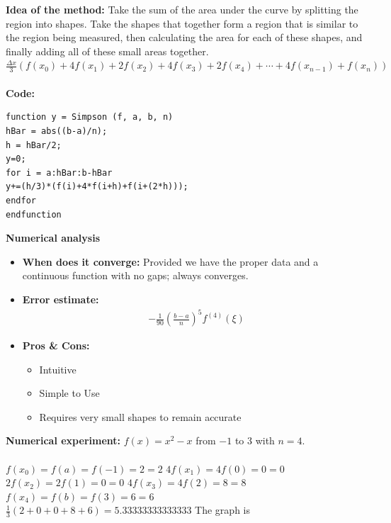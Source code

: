 \documentclass{article}
\begin{document}
{\bf Idea of the method:} 
Take the sum of the area under the curve by splitting the region into shapes. Take the shapes that together form a region that is similar to the region being measured, then calculating the area for each of these shapes, and finally adding all of these small areas together. \\
$\frac { \Delta x } { 3 } \left( f \left( x _ { 0 } \right) + 4 f \left( x _ { 1 } \right) + 2 f \left( x _ { 2 } \right) + 4 f \left( x _ { 3 } \right) + 2 f \left( x _ { 4 } \right) + \cdots + 4 f \left( x _ { n - 1 } \right) + f \left( x _ { n } \right) \right)$
{\\\bf Code:}
\begin{verbatim}
function y = Simpson (f, a, b, n)
hBar = abs((b-a)/n);
h = hBar/2;
y=0;
for i = a:hBar:b-hBar
y+=(h/3)*(f(i)+4*f(i+h)+f(i+(2*h)));
endfor
endfunction
\end{verbatim}
{\bf Numerical analysis}
\begin{itemize}
	\item{\bf When does it converge:} Provided we have the proper data and a continuous function with no gaps; always converges.
	\item {\bf Error estimate:}
	\begin{equation}
	\begin{split}
&- \frac { 1 } { 90 } \left( \frac { b - a } { n } \right) ^ { 5 } f ^ { ( 4 ) } ( \xi )
	\end{split}
	\end{equation}
	\item {\bf Pros \& Cons:}
	\begin{itemize}
		\item Intuitive
		\item Simple to Use
		\item Requires very small shapes to remain accurate
	\end{itemize}
\end{itemize}
{\bf Numerical experiment:}
$ f(x)=x^2-x $ from $ -1$ to 3 with $ n=4 $.\\
\\
$f \left( x _ { 0 } \right) = f ( a ) = f ( - 1 ) = 2 = 2$
$4 f \left( x _ { 1 } \right) = 4 f ( 0 ) = 0 = 0$
$2 f \left( x _ { 2 } \right) = 2 f ( 1 ) = 0 = 0$
$4 f \left( x _ { 3 } \right) = 4 f ( 2 ) = 8 = 8$
$f \left( x _ { 4 } \right) = f ( b ) = f ( 3 ) = 6 = 6$
\\
$\frac { 1 } { 3 } ( 2 + 0 + 0 + 8 + 6 ) = 5.33333333333333$
The graph is
\end{document}
